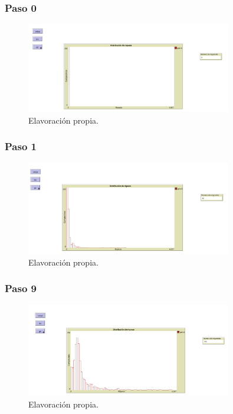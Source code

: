 \documentclass[17pt, t, lualatex]{beamer}
\begin{document}
\insertsectionpage

\begin{frame}
  \frametitle{Paso 0}
  \begin{figure}[ht]
    \centering
    \includegraphics[width = 0.8\textwidth]{img/img4.png}
    \caption{Elavoración propia.}
  \end{figure}
\end{frame}


\begin{frame}
  \frametitle{Paso 1}
  \begin{figure}[ht]
    \centering
    \includegraphics[width = 0.8\textwidth]{img/img5.png}
    \caption{Elavoración propia.}
  \end{figure}
\end{frame}

\begin{frame}
  \frametitle{Paso 9}
  \begin{figure}[ht]
    \centering
    \includegraphics[width = 0.8\textwidth]{img/img6.png}
    \caption{Elavoración propia.}
  \end{figure}
\end{frame}
\end{document}
